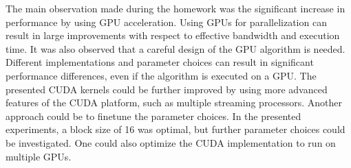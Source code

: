 \documentclass[conference]{IEEEtran}
\begin{document}
    The main observation made during the homework was the significant increase in performance by using GPU acceleration. Using GPUs for parallelization can result in large improvements with respect to effective bandwidth and execution time. It was also observed that a careful design of the GPU algorithm is needed. Different implementations and parameter choices can result in significant performance differences, even if the algorithm is executed on a GPU. The presented CUDA kernels could be further improved by using more advanced features of the CUDA platform, such as multiple streaming processors. Another approach could be to finetune the parameter choices. In the presented experiments, a block size of 16 was optimal, but further parameter choices could be investigated. One could also optimize the CUDA implementation to run on multiple GPUs. 

    \newpage
    \printbibliography
\end{document}
